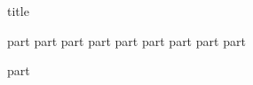 \documentclass[paper=216.35mm:303.35mm,pagesize=pdftex,final,headinclude=false,footinclude=false,twoside,sfdefaults=false]{kaobook}
\begin{document}
    {title}
    \mainmatter

    {part}
    {part}
    {part}
    {part}
    {part}
    {part}
    {part}
    {part}
    {part}


    \backmatter
    {part}
\end{document}
